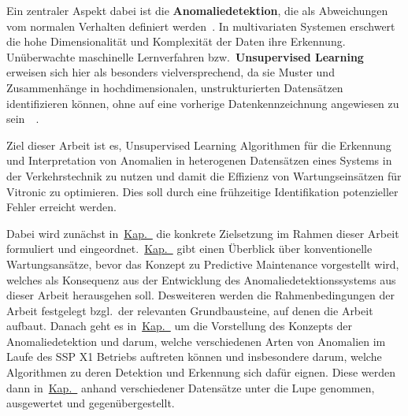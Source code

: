 Ein zentraler Aspekt dabei ist die \textbf{Anomaliedetektion}, die als Abweichungen vom normalen Verhalten definiert
werden~\cite{Chandola2009}. In multivariaten Systemen erschwert die hohe Dimensionalität und Komplexität der Daten ihre Erkennung.
Unüberwachte maschinelle Lernverfahren bzw.~\textbf{Unsupervised Learning} erweisen sich hier als besonders vielversprechend,
da sie Muster und Zusammenhänge in hochdimensionalen, unstrukturierten Datensätzen identifizieren können, ohne auf eine vorherige
Datenkennzeichnung angewiesen zu sein~\cite{Chandola2009}~\cite[S.~22--24]{Wenig2024}.

Ziel dieser Arbeit ist es, Unsupervised Learning Algorithmen für die Erkennung und Interpretation von Anomalien in
heterogenen Datensätzen eines Systems in der Verkehrstechnik zu nutzen und damit die Effizienz von Wartungseinsätzen für
Vitronic zu optimieren. Dies soll durch eine frühzeitige Identifikation potenzieller Fehler erreicht werden.

Dabei wird zunächst in~\hyperref[ch:zielsetzung]{Kap.~} die konkrete Zielsetzung im Rahmen dieser Arbeit formuliert
und eingeordnet.~\hyperref[ch:pdm_theorie]{Kap.~} gibt einen Überblick über konventionelle Wartungsansätze,
bevor das Konzept zu Predictive Maintenance vorgestellt wird, welches als Konsequenz aus der Entwicklung des Anomaliedetektionssystems
aus dieser Arbeit herausgehen soll. Desweiteren werden die Rahmenbedingungen der Arbeit festgelegt bzgl.~der relevanten Grundbausteine,
auf denen die Arbeit aufbaut. Danach geht es in~\hyperref[ch:anomalien]{Kap.~} um die Vorstellung des Konzepts der
Anomaliedetektion und darum, welche verschiedenen Arten von Anomalien im Laufe des SSP X1 Betriebs auftreten können und insbesondere
darum, welche Algorithmen zu deren Detektion und Erkennung sich dafür eignen. Diese werden dann
in~\hyperref[ch:anomaliedetektion_test]{Kap.~} anhand verschiedener Datensätze unter die Lupe genommen,
ausgewertet und gegenübergestellt.
